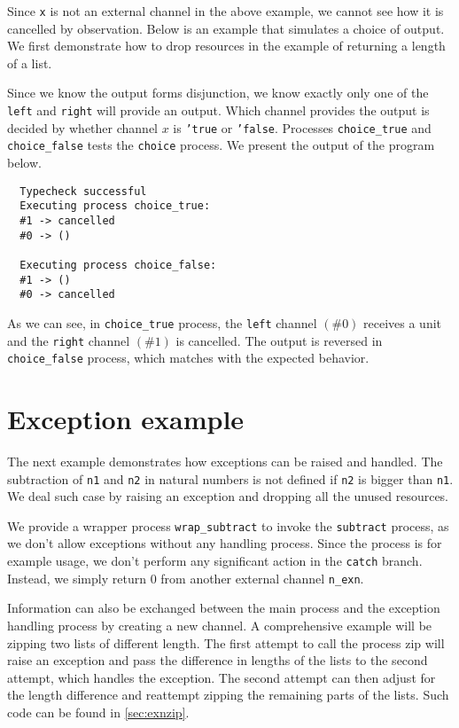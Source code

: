 \documentclass[12pt, openany]{memoir}
\begin{document}
Since \texttt{x} is not an external channel in the above example, we cannot see how it is cancelled by observation.
Below is an example that simulates a choice of output. 
We first demonstrate how to drop resources in the example of returning a length of a list.

Since we know the output forms disjunction, we know exactly only one of the \texttt{left} and \texttt{right}
will provide an output. 
Which channel provides the output is decided by whether channel $x$ is \texttt{'true} or \texttt{'false}.
Processes \texttt{choice\_true} and \texttt{choice\_false} tests the \texttt{choice} process.
We present the output of the program below.
\begin{verbatim}
  Typecheck successful                  
  Executing process choice_true:
  #1 -> cancelled
  #0 -> ()

  Executing process choice_false:
  #1 -> ()
  #0 -> cancelled
\end{verbatim}
As we can see, in \texttt{choice\_true} process, the \texttt{left} channel $(\# 0)$ receives a unit and the \texttt{right} channel $(\# 1)$ is cancelled.
The output is reversed in \texttt{choice\_false} process, which matches with the expected behavior.
\section{Exception example}
The next example demonstrates how exceptions can be raised and handled. 
The subtraction of \texttt{n1} and \texttt{n2} in natural numbers is not defined if 
\texttt{n2} is bigger than \texttt{n1}. We deal such case by raising an exception and dropping all the unused resources.

We provide a wrapper process \texttt{wrap\_subtract} to invoke the \texttt{subtract} process, 
as we don't allow exceptions without any handling process. 
Since the process is for example usage, we don't perform any significant action in the \texttt{catch} branch. 
Instead, we simply return $0$ from another external channel \texttt{n\_exn}.

Information can also be exchanged between the main process and the exception handling process by creating a new channel. 
A comprehensive example will be zipping two lists of different length.
The first attempt to call the process zip will raise an exception and pass the difference in lengths of the lists to the second attempt, 
which handles the exception. The second attempt can then adjust for the length difference and reattempt zipping the remaining parts of the lists.
Such code can be found in \cref{sec:exnzip}.
\end{document}
